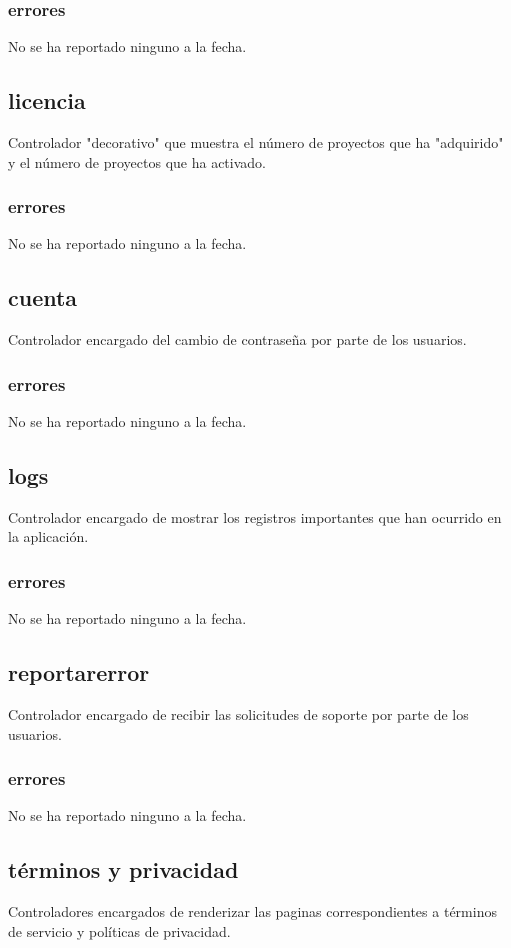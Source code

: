 \documentclass[10pt,a4paper]{book}
\begin{document}
	\subsubsection{errores}
	No se ha reportado ninguno a la fecha.


	\subsection{licencia}
	Controlador "decorativo" que muestra el número de proyectos que ha "adquirido" y el número de proyectos que ha activado.
	\subsubsection{errores}
	No se ha reportado ninguno a la fecha.

	\subsection{cuenta}
	Controlador encargado del cambio de contraseña por parte de los usuarios.
	\subsubsection{errores}
	No se ha reportado ninguno a la fecha.

	\subsection{logs}
	Controlador encargado de mostrar los registros importantes que han ocurrido en la aplicación.
	\subsubsection{errores}
	No se ha reportado ninguno a la fecha.

	\subsection{reportarerror}
	Controlador encargado de recibir las solicitudes de soporte por parte de los usuarios.
	\subsubsection{errores}
	No se ha reportado ninguno a la fecha.

	\subsection{términos y privacidad}
	Controladores encargados de renderizar las paginas correspondientes a términos de servicio y políticas de privacidad.
\end{document}
